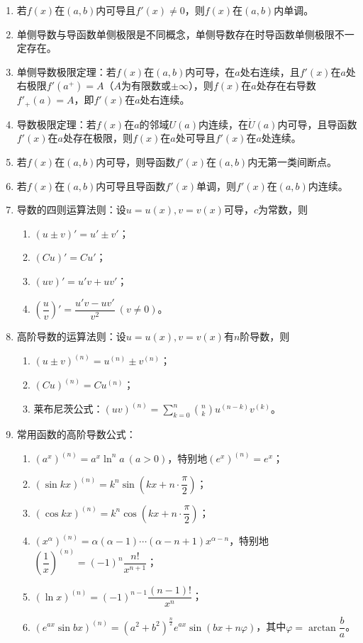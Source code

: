 \documentclass[UTF8]{ctexart}
\theoremstyle{remark}
\begin{document}
\begin{enumerate}
	\item 若$f(x)$在$(a,b)$内可导且$f'(x) \neq 0$，则$f(x)$在$(a,b)$内单调。
	
	\item 单侧导数与导函数单侧极限是不同概念，单侧导数存在时导函数单侧极限不一定存在。
	
	\item 单侧导数极限定理：若$f(x)$在$(a,b)$内可导，在$a$处右连续，且$f'(x)$在$a$处右极限$f'(a^+) = A$（$A$为有限数或$\pm\infty$），则$f(x)$在$a$处存在右导数$f'_+(a) = A$，即$f'(x)$在$a$处右连续。
	
	\item 导数极限定理：若$f(x)$在$a$的邻域$U(a)$内连续，在$\dot{U}(a)$内可导，且导函数$f'(x)$在$a$处存在极限，则$f(x)$在$a$处可导且$f'(x)$在$a$处连续。
	
	\item 若$f(x)$在$(a,b)$内可导，则导函数$f'(x)$在$(a,b)$内无第一类间断点。
	
	\item 若$f(x)$在$(a,b)$内可导且导函数$f'(x)$单调，则$f'(x)$在$(a,b)$内连续。
	
	\item 导数的四则运算法则：设$u=u(x), v=v(x)$可导，$c$为常数，则
	\begin{enumerate}
		\item $(u \pm v)' = u' \pm v'$；
		\item $(Cu)' = Cu'$；
		\item $(uv)' = u'v + uv'$；
		\item $\left(\dfrac{u}{v}\right)' = \dfrac{u'v - uv'}{v^2} \ (v \neq 0)$。
	\end{enumerate}
	
	\item 高阶导数的运算法则：设$u=u(x), v=v(x)$有$n$阶导数，则
	\begin{enumerate}
		\item $(u \pm v)^{(n)} = u^{(n)} \pm v^{(n)}$；
		\item $(Cu)^{(n)} = Cu^{(n)}$；
		\item 莱布尼茨公式：$(uv)^{(n)} = \sum_{k=0}^{n} \binom{n}{k} u^{(n-k)} v^{(k)}$。
	\end{enumerate}
	
	\item 常用函数的高阶导数公式：
	\begin{enumerate}
		\item $(a^x)^{(n)} = a^x \ln^n a \ (a>0)$，特别地$(e^x)^{(n)} = e^x$；
		\item $(\sin kx)^{(n)} = k^n \sin\left(kx + n \cdot \dfrac{\pi}{2}\right)$；
		\item $(\cos kx)^{(n)} = k^n \cos\left(kx + n \cdot \dfrac{\pi}{2}\right)$；
		\item $(x^\alpha)^{(n)} = \alpha(\alpha-1)\cdots(\alpha-n+1)x^{\alpha-n}$，特别地$\left(\dfrac{1}{x}\right)^{(n)} = (-1)^n \dfrac{n!}{x^{n+1}}$；
		\item $(\ln x)^{(n)} = (-1)^{n-1} \dfrac{(n-1)!}{x^n}$；
		\item $(e^{ax} \sin bx)^{(n)} = (a^2 + b^2)^{\frac{n}{2}} e^{ax} \sin(bx + n\varphi)$，其中$\varphi = \arctan\dfrac{b}{a}$。
	\end{enumerate}
	

\end{enumerate}
\end{document}
